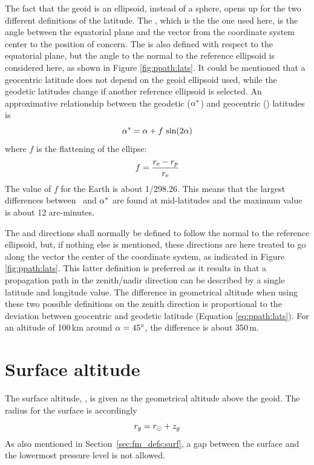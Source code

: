 The fact that the geoid is an ellipsoid, instead of a sphere, opens up
for the two different definitions of the latitude. The
, which is the the one used here, is the
angle between the equatorial plane and the vector from the coordinate
system center to the position of concern. The  is also defined with respect to the equatorial plane, but
the angle to the normal to the reference ellipsoid is considered here, as
shown in Figure \ref{fig:ppath:lats}. It could be mentioned that a
geocentric latitude does not depend on the geoid ellipsoid used, while
the geodetic latitudes change if another reference ellipsoid is
selected. An approximative relationship between the geodetic
($\alpha^*$) and geocentric (\Lat) latitudes is \citep{montenbruck:00}
\begin{equation}
 \alpha^* = \alpha + f\,\sin(2\alpha)  
 \label{eq:ppath:lats}
\end{equation}
where $f$ is the flattening of the ellipse:
\begin{equation}
 f = \frac{r_{e}-r_{p}}{r_{e}}
 \label{eq:ppath:flattening}
\end{equation}
The value of $f$ for the Earth is about 1/298.26. This means that the
largest differences between \Lat\ and $\alpha^*$ are found at
mid-latitudes and the maximum value is about 12 arc-minutes.

The  and  directions shall normally be
defined to follow the normal to the reference ellipsoid, but, if
nothing else is mentioned, these directions are here treated to go
along the vector the center of the coordinate system, as indicated in
Figure \ref{fig:ppath:lats}. This latter definition is preferred
as it results in that a propagation path in the zenith/nadir direction
can be described by a single latitude and longitude value. The
difference in geometrical altitude when using these two possible
definitions on the zenith direction is proportional to the deviation
between geocentric and geodetic latitude (Equation \ref{eq:ppath:lats}).
For an altitude of 100\,km around $\alpha=45^\circ$, the difference is
about 350\,m.






\section{Surface altitude}

The surface altitude, , is given as the geometrical altitude above the
geoid. The radius for the surface is accordingly
\begin{equation}
  r_{g} = r_{\odot} + z_{g}
 \label{eq:fm_defs:zsurface}
\end{equation}
As also mentioned in Section~\ref{sec:fm_defs:surf}, a gap between the surface
and the lowermost pressure level is not allowed.

